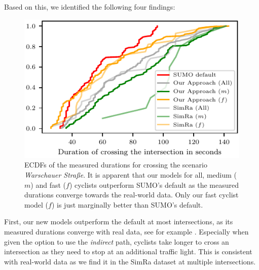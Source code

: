 Based on this, we identified the following four findings:
\begin{figure}
    \centering
    \includegraphics[width=0.7\columnwidth]{fig/im_warschauer_ecdf_every.pdf}
    \caption{%
        ECDFs of the measured durations for crossing the scenario \textit{Warschauer Straße}.
        It is apparent that our models for all, medium ($m$) and fast ($f$) cyclists outperform SUMO's default as the measured durations converge towards the real-world data.
        Only our fast cyclist model ($f$) is just marginally better than SUMO's default.
    }%
    \label{fig:im_warschauer}
\end{figure}
First, our new models outperform the default at most intersections, as its measured durations converge with real data, see for example .
Especially when given the option to use the \textit{indirect} path, cyclists take longer to cross an intersection as they need to stop at an additional traffic light.
This is consistent with real-world data as we find it in the SimRa dataset at multiple intersections.

